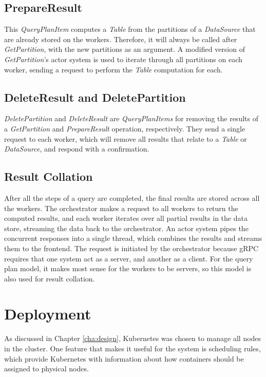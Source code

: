 \pagebreak
\subsection{PrepareResult}
This \textit{QueryPlanItem} computes a \textit{Table} from the partitions of a \textit{DataSource} that are already stored on the workers. Therefore, it will always be called after \textit{GetPartition}, with the new partitions as an argument. A modified version of \textit{GetPartition}'s actor system is used to iterate through all partitions on each worker, sending a request to perform the \textit{Table} computation for each.

\subsection{DeleteResult and DeletePartition}
\textit{DeletePartition} and \textit{DeleteResult} are \textit{QueryPlanItems} for removing the results of a \textit{GetPartition} and \textit{PrepareResult} operation, respectively. They send a single request to each worker, which will remove all results that relate to a \textit{Table} or \textit{DataSource}, and respond with a confirmation.

\subsection{Result Collation}
After all the steps of a query are completed, the final results are stored across all the workers. The orchestrator makes a request to all workers to return the computed results, and each worker iterates over all partial results in the data store, streaming the data back to the orchestrator. An actor system pipes the concurrent responses into a single thread, which combines the results and streams them to the frontend. The request is initiated by the orchestrator because gRPC requires that one system act as a server, and another as a client. For the query plan model, it makes most sense for the workers to be servers, so this model is also used for result collation.

\pagebreak
\section{Deployment}
As discussed in Chapter \ref{cha:design}, Kubernetes was chosen to manage all nodes in the cluster. One feature that makes it useful for the system is scheduling rules, which provide Kubernetes with information about how containers should be assigned to physical nodes.

